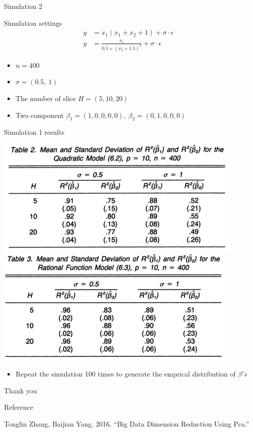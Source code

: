 \documentclass[ignorenonframetext,]{beamer}
\providecommand{\tightlist}{%
  \setlength{\itemsep}{0pt}\setlength{\parskip}{0pt}}
\begin{document}
\begin{frame}{Simulation 2}

\begin{exampleblock}{Simulation settings}
\begin{align*}
y &= x_1(x_1 + x_2 + 1) + \sigma \cdot \epsilon \\
y &= \frac{x_1}{0.5 + {(x_2 + 1.5)}^2} + \sigma \cdot \epsilon
\end{align*}
\begin{itemize}
    \item $n = 400$
    \item $\sigma = (0.5, ~1) $
    \item The number of slice $H = (5, 10, 20)$ 
    \item Two component $\beta_1 = (1,0,0,0,0), ~ \beta_2 = (0,1,0,0,0)$
\end{itemize}
\end{exampleblock}

\end{frame}

\begin{frame}{Simulation 1 results}

\includegraphics{./pic/result_2.png}
\includegraphics{./pic/result_3.png}

\begin{itemize}
\tightlist
\item
  Repeat the simulation 100 times to generate the emprical distribution
  of \(\beta's\)
\end{itemize}

\end{frame}

\begin{frame}{}

\begin{center}
\Huge Thank you
\end{center}

\end{frame}

\begin{frame}{Reference}

\hypertarget{refs}{}
\hypertarget{ref-ref5}{}
Tonglin Zhang, Baijian Yang. 2016. ``Big Data Dimension Reduction Using
Pca.''

\end{frame}
\end{document}
